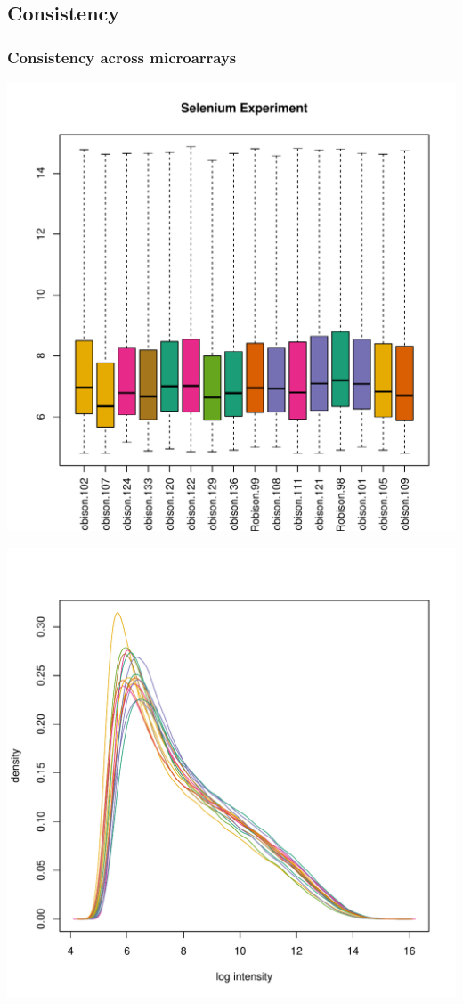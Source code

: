 \documentclass[pdf]{beamer}
\begin{document}
\subsection{Consistency}
\begin{frame}
  \frametitle{Consistency across microarrays}
  \begin{center}
  \centering \includegraphics[scale=0.45]{figures/affybxp.pdf}
  \end{center}
\end{frame}

\begin{frame}
  \begin{center}
  \includegraphics[scale=0.45]{figures/affyhist.pdf}  
  \end{center}
\end{frame}
\end{document}
